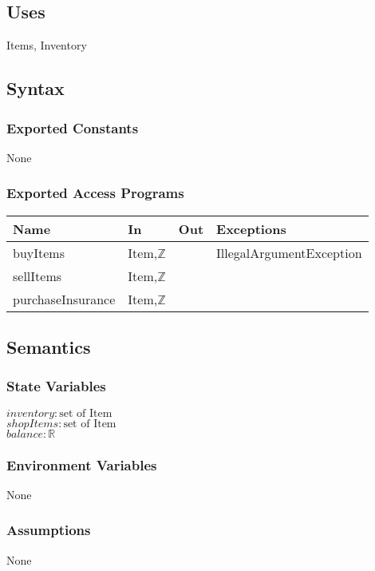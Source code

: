 \documentclass[12pt, titlepage]{article}
\begin{document}
\subsection{Uses}
Items, Inventory 


\subsection{Syntax}

\subsubsection{Exported Constants}
None

\subsubsection{Exported Access Programs}

\begin{center}
\begin{tabular}{p{4cm} p{3cm} p{2cm} p{3cm}}
\hline
\textbf{Name} & \textbf{In} & \textbf{Out} & \textbf{Exceptions} \\
\hline
buyItems & Item,$\mathbb{Z}$  &  & IllegalArgumentException \\
\hline
sellItems &  Item,$\mathbb{Z}$ &  & \\
\hline
purchaseInsurance & Item,$\mathbb{Z}$ & & \\
\hline
\end{tabular}
\end{center}

\subsection{Semantics}

\subsubsection{State Variables}
$\mathit{inventory}: \text{set of Item}$\\
$\mathit{shopItems}: \text{set of Item}$\\
$\mathit{balance}: \mathbb{R}$\\
\subsubsection{Environment Variables}
None

\subsubsection{Assumptions}
None
\end{document}
